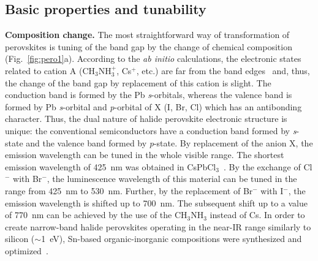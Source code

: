 \documentclass[journal=chreay,manuscript=review]{achemso}
\begin{document}
\subsection{Basic properties and tunability}

\textbf{Composition change.}
The most straightforward way of transformation of perovskites is tuning of the band gap by the change of chemical composition (Fig.~\ref{fig:pero1}a). According to the \textit{ab initio} calculations, the electronic states related to cation A (CH$_3$NH$_3^+$, Cs$^+$, etc.) are far from the band edges~\cite{yin2015halide} and, thus, the change of the band gap by replacement of this cation is slight. The conduction band is formed by the Pb \textit{s}-orbitals, whereas the valence band is formed by Pb \textit{s}-orbital and \textit{p}-orbital of X (I, Br, Cl) which has an antibonding character. Thus, the dual nature of halide perovskite electronic structure is unique: the conventional semiconductors have a conduction band formed by \textit{s}-state and the valence band formed by \textit{p}-state. By replacement of the anion X, the emission wavelength can be tuned in the whole visible range\cite{sutherland2016perovskite}. The shortest emission wavelength of 425~nm was obtained in CsPbCl$_3$~\cite{protesescu2015nanocrystals}. By the exchange of Cl$^-$ with Br$^-$, the luminescence wavelength of this material can be tuned in the range from 425~nm to 530~nm. Further, by the replacement of Br$^-$ with I$^-$, the emission wavelength is shifted up to 700~nm. The subsequent shift up to a value of 770~nm can be achieved by the use of the CH$_3$NH$_3$ instead of Cs\cite{zhao2017high}. In order to create narrow-band halide perovskites operating in the near-IR range similarly to silicon ($\sim$1~eV), Sn-based organic-inorganic compositions were synthesized and optimized~\cite{chang2020tunable}.

\end{document}
